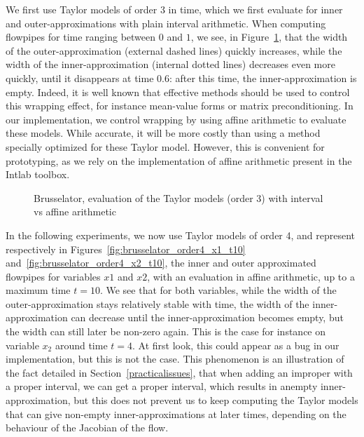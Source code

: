 \documentclass{sig-alternate-05-2015} %
\begin{document}
We first use Taylor models of order 3 in time, which we first evaluate for inner and outer-approximations 
with plain interval arithmetic. When computing flowpipes for time ranging between $0$ and $1$, 
we see, in Figure~\ref{fig:brusselator_order3_t1}, that the width of the outer-approximation 
(external dashed lines) quickly increases, while the 
width of the inner-approximation (internal dotted lines) decreases even more quickly, 
until it disappears at time 0.6: after this time, the inner-approximation is empty. Indeed, it is well 
known that effective methods should be used to control this wrapping effect, for instance mean-value 
forms or matrix preconditioning. In our implementation, we control wrapping by using 
affine arithmetic to evaluate these models. While accurate, it will be more costly than using 
a method specially optimized for these Taylor model. However, this is convenient for prototyping, 
as we rely on the implementation of affine arithmetic present in the Intlab 
toolbox.
 
\begin{figure}[htbp]
\begin{center}
\end{center}
\caption{Brusselator, evaluation of the Taylor models (order 3) with interval vs affine arithmetic \label{fig:brusselator_order3_t1}}
\end{figure}

In the following experiments, we now use Taylor models of order 4, and represent respectively in Figures~\ref{fig:brusselator_order4_x1_t10} and~\ref{fig:brusselator_order4_x2_t10}, the inner and outer approximated flowpipes for variables $x1$ and $x2$, with an evaluation in affine arithmetic, up to a maximum time $t=10$. We see that for both variables, while the width of the outer-approximation stays relatively stable with time, the width of the inner-approximation can decrease until the inner-approximation becomes empty, but the width can still later be non-zero again. This is the case for instance on variable $x_2$ around time $t=4$. At first look, this could appear as a bug in our implementation, but this is not the case. This phenomenon is an illustration of the fact detailed in Section~\ref{practicalissues}, that when adding an improper with a proper interval, we can get a proper interval, which results in anempty inner-approximation, but this does not prevent us to keep computing the Taylor models that can give non-empty inner-approximations at later times, depending on the behaviour of the Jacobian of the flow.    
\end{document}
